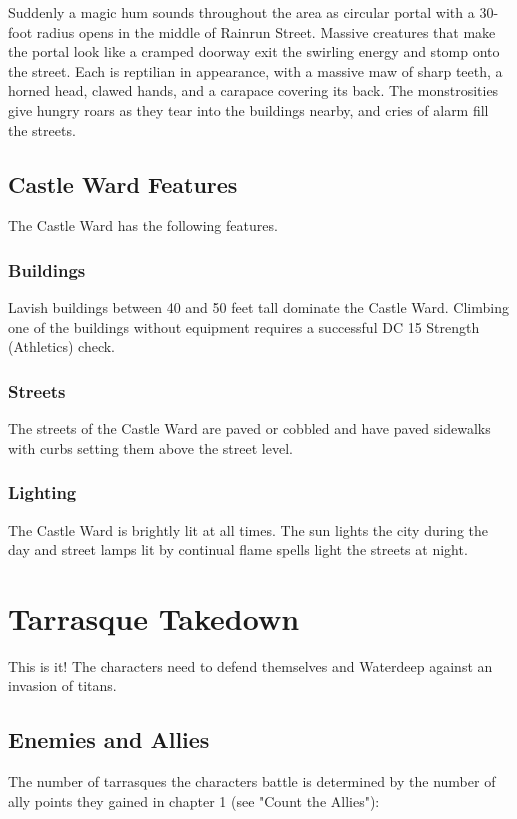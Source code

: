 \documentclass[10pt,a4paper,twoside,bg=print,twocolumn,openany,nodeprecatedcode]{dndbook}
\begin{document}
Suddenly a magic hum sounds throughout the area as circular portal with a 30-foot radius opens in the middle of Rainrun Street. Massive creatures that make the portal look like a cramped doorway exit the swirling energy and stomp onto the street. Each is reptilian in appearance, with a massive maw of sharp teeth, a horned head, clawed hands, and a carapace covering its back. The monstrosities give hungry roars as they tear into the buildings nearby, and cries of alarm fill the streets.

\subsection{Castle Ward Features}
The Castle Ward has the following features.

\subsubsection{Buildings}
Lavish buildings between 40 and 50 feet tall dominate the Castle Ward. Climbing one of the buildings without equipment requires a successful DC 15 Strength (Athletics) check.

\subsubsection{Streets}
The streets of the Castle Ward are paved or cobbled and have paved sidewalks with curbs setting them above the street level.

\subsubsection{Lighting}
The Castle Ward is brightly lit at all times. The sun lights the city during the day and street lamps lit by continual flame spells light the streets at night.

\section{Tarrasque Takedown}
This is it! The characters need to defend themselves and Waterdeep against an invasion of titans.

\subsection{Enemies and Allies}
The number of tarrasques the characters battle is determined by the number of ally points they gained in chapter 1 (see "Count the Allies"):
\end{document}
